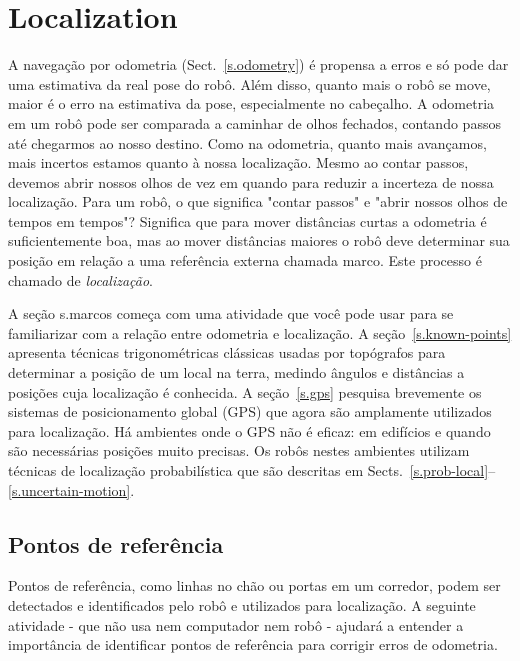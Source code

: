 
\chapter{Localization}\label{ch.local}

A navegação por odometria (Sect.~\ref{s.odometry}) é propensa a erros e só pode dar uma estimativa da real pose do robô. Além disso, quanto mais o robô se move, maior é o erro na estimativa da pose, especialmente no cabeçalho. A odometria em um robô pode ser comparada a caminhar de olhos fechados, contando passos até chegarmos ao nosso destino. Como na odometria, quanto mais avançamos, mais incertos estamos quanto à nossa localização. Mesmo ao contar passos, devemos abrir nossos olhos de vez em quando para reduzir a incerteza de nossa localização. Para um robô, o que significa "contar passos" e "abrir nossos olhos de tempos em tempos"? Significa que para mover distâncias curtas a odometria é suficientemente boa, mas ao mover distâncias maiores o robô deve determinar sua posição em relação a uma referência externa chamada marco. Este processo é chamado de \emph{localização}.

A seção {s.marcos} começa com uma atividade que você pode usar para se familiarizar com a relação entre odometria e localização. A seção~\ref{s.known-points} apresenta técnicas trigonométricas clássicas usadas por topógrafos para determinar a posição de um local na terra, medindo ângulos e distâncias a posições cuja localização é conhecida. A seção~\ref{s.gps} pesquisa brevemente os sistemas de posicionamento global (GPS) que agora são amplamente utilizados para localização. Há ambientes onde o GPS não é eficaz: em edifícios e quando são necessárias posições muito precisas. Os robôs nestes ambientes utilizam técnicas de localização probabilística que são descritas em Sects.~\ref{s.prob-local}--\ref{s.uncertain-motion}.

\section{Pontos de referência}\label{s.landmarks}

Pontos de referência, como linhas no chão ou portas em um corredor, podem ser detectados e identificados pelo robô e utilizados para localização. A seguinte atividade - que não usa nem computador nem robô - ajudará a entender a importância de identificar pontos de referência para corrigir erros de odometria.

